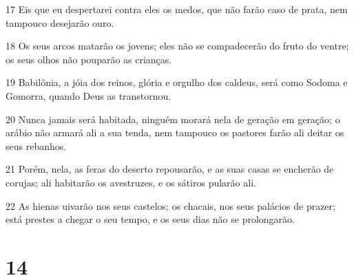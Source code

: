 \par 17 Eis que eu despertarei contra eles os medos, que não farão caso de prata, nem tampouco desejarão ouro.
\par 18 Os seus arcos matarão os jovens; eles não se compadecerão do fruto do ventre; os seus olhos não pouparão as crianças.
\par 19 Babilônia, a jóia dos reinos, glória e orgulho dos caldeus, será como Sodoma e Gomorra, quando Deus as transtornou.
\par 20 Nunca jamais será habitada, ninguém morará nela de geração em geração; o arábio não armará ali a sua tenda, nem tampouco os pastores farão ali deitar os seus rebanhos.
\par 21 Porém, nela, as feras do deserto repousarão, e as suas casas se encherão de corujas; ali habitarão os avestruzes, e os sátiros pularão ali.
\par 22 As hienas uivarão nos seus castelos; os chacais, nos seus palácios de prazer; está prestes a chegar o seu tempo, e os seus dias não se prolongarão.

\chapter{14}

